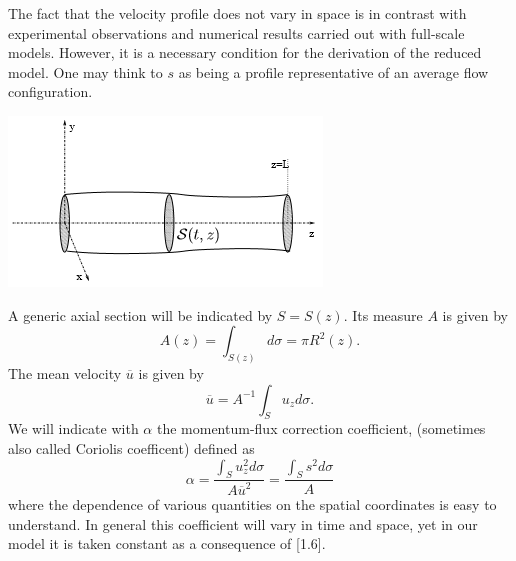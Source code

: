 \documentclass[a4paper]{report}
\begin{document}
The fact that the velocity profile does not vary in space is in contrast with experimental observations and numerical results carried out with full-scale models. However, it is a necessary condition for the derivation of the reduced model. One may think to $s$ as being a profile representative of an average flow configuration.\\
		\begin{center}
			\includegraphics[scale=1]{tubo_dritto}
		\end{center}
A generic axial section will be indicated by $S=S(z)$. Its measure $A$ is given by
	\begin{equation}
		A(z) =\int_{S(z)} d\sigma = \pi R^{2}(z).
	\end{equation}
The mean velocity $ \overline{u}$ is given by
	\begin{equation}
		\overline{u}=A^{-1} \int_{S} u_{z} d\sigma.
	\end{equation}
We will indicate with $\alpha$ the momentum-flux correction coefficient, (sometimes also called Coriolis coefficent) defined as
	\begin{equation}
		\alpha = \frac{\int_{S} u_{z}^{2} d\sigma}{A \overline{u}^{2}}= \frac{\int_{S} s^{2} d\sigma}{A}
	\end{equation}
where the dependence of various quantities on the spatial coordinates is easy to understand. In general this coefficient will vary in time and space, yet in our model it is taken constant as a consequence of [1.6].
\end{document}
